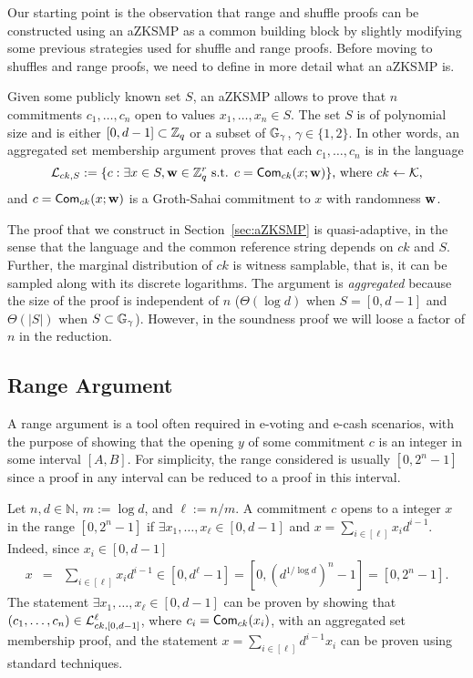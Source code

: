 Our starting point is the observation that range and shuffle proofs can be constructed using an aZKSMP as a common building block by slightly modifying some previous strategies used for shuffle and range proofs. Before moving to shuffles and range proofs, we need to define in more detail what an aZKSMP is.

Given some publicly known set $S$, an aZKSMP allows to prove that $n$ commitments $c_1,\ldots,c_n$ open to values $x_1,\ldots,x_n \in S$.  The set $S$ is of polynomial size and is either $[0,d-1]\subset\mathbb{Z}_q$ or a subset of $\mathbb{G}_\gamma$, $\gamma \in \{1,2\}$.  
In other words, an aggregated set membership argument proves that each $c_1,\ldots,c_n$ is in the language
$$
\mathcal{L}_{ck,S}:=\{c: \exists x\in S, \mathbf{w}\in\mathbb{Z}_q^r \text{ s.t. } c=\mathsf{Com}_{ck}(x;\mathbf{w})\}\text{, where }ck\gets\mathcal{K},
$$
and $c=\mathsf{Com}_{ck}(x;\mathbf{w})$ is a Groth-Sahai commitment to $x$ with randomness $\mathbf{w}$.

The proof that we construct in Section~\ref{sec:aZKSMP} is quasi-adaptive, in the sense that the language and the common reference string depends on $ck$ and $S$. Further, the marginal distribution of $ck$ is witness samplable, that is, it can be sampled along with its discrete logarithms. The argument is \textit{aggregated} because the size of the proof is independent of $n$ ($\Theta(\log d)$ when $S=[0,d-1]$ and $\Theta(|S|)$ when $S\subset\mathbb{G}_\gamma$). However, in the soundness proof we will loose a factor of $n$ in the reduction. 

\subsection{Range Argument}
A range argument is a tool often required in e-voting and e-cash scenarios, with the purpose of showing that the opening $y$ of some commitment $c$ is an integer in some interval $[A,B]$. For simplicity, the range considered is usually $[0,2^n-1]$ since a proof in any interval can be reduced to a proof in this interval.

Let $n,d\in\mathbb{N}$, $m:=\log d$, and $\ell:=n/m$. A commitment $c$ opens to a integer $x$ in the range $[0,2^n-1]$ if $\exists x_1,\ldots,x_\ell \in[0,d-1]$ and  $x=\sum_{i\in[\ell]}x_id^{i-1}$. Indeed, since $x_i\in[0,d-1]$
\begin{eqnarray*}
x & = & \sum_{i\in[\ell]} x_i d^{i-1}
   \in  [0,d^\ell-1]  =  [0,(d^{1/\log d})^n-1] = [0,2^n-1].
\end{eqnarray*}
The statement $\exists x_1,\ldots,x_\ell \in[0,d-1]$ can be proven by showing that $(c_1,\ldots,c_n)\in\mathcal{L}_{ck,[0,d-1]}^\ell$, where $c_i=\mathsf{Com}_{ck}(x_i)$, with an aggregated set membership proof, and the statement $x=\sum_{i\in[\ell]}d^{i-1}x_i$ can be proven using standard techniques. 

